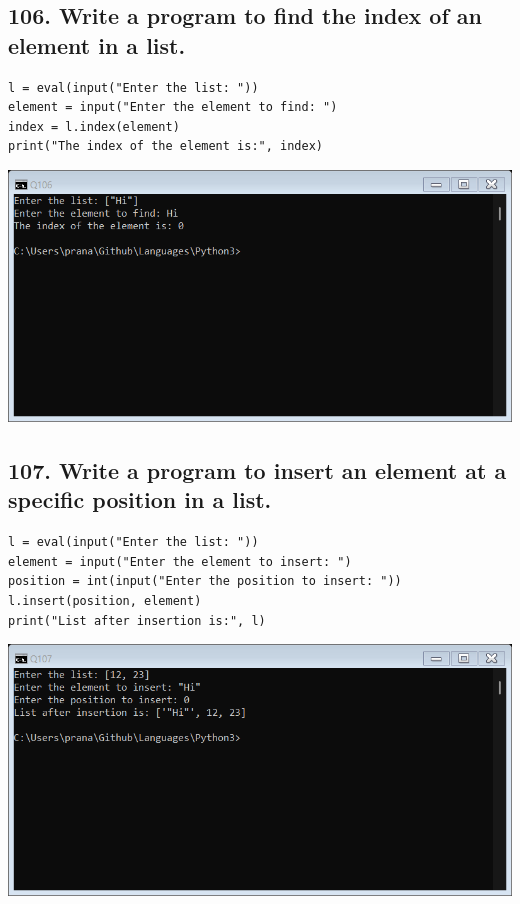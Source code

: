 \documentclass[12pt]{article}
\begin{document}
\subsection*{106. Write a program to find the index of an element in a list.}
\begin{verbatim}
l = eval(input("Enter the list: "))
element = input("Enter the element to find: ")
index = l.index(element)
print("The index of the element is:", index)
\end{verbatim}
\includegraphics[width=\linewidth]{images/106.png}

\subsection*{107. Write a program to insert an element at a specific position in a list.}
\begin{verbatim}
l = eval(input("Enter the list: "))
element = input("Enter the element to insert: ")
position = int(input("Enter the position to insert: "))
l.insert(position, element)
print("List after insertion is:", l)
\end{verbatim}
\includegraphics[width=\linewidth]{images/107.png}
\end{document}
